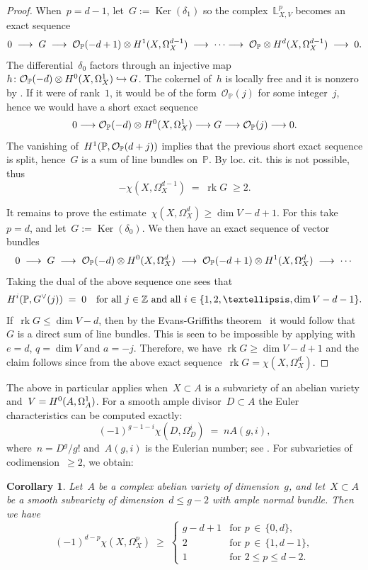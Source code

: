 \documentclass[a4paper]{amsart}
\newcommand{\bbL}{\mathbb{L}}
\newcommand{\bbP}{\mathbb{P}}
\newcommand{\bbZ}{\mathbb{Z}}
\newcommand{\cO}{\mathcal{O}}
\newcommand{\rH}{\textup{H}}
\newcommand{\into}{\hookrightarrow}
\newcommand{\too}{\longrightarrow}
\renewcommand{\ker}{\Ker}
\DeclareMathOperator{\rk}{rk}
\DeclareMathOperator{\Ker}{Ker}
\renewcommand{\le}{\leqslant}
\renewcommand{\ge}{\geqslant}
\theoremstyle{plain}
\newtheorem{corollary}[theorem]{Corollary}
\theoremstyle{definition}
\numberwithin{equation}{section}
\begin{document}
\begin{proof}
When~$p = d-1$, let~$G := \ker(\delta_1)$ so the complex~$\bbL^p_{X,V}$ becomes an exact sequence
\[ 0 \; \too \; G \; \too \; \cO_{\bbP}(-d + 1) \otimes \rH^1(X, \Omega^{d-1}_X) \; \too \; \cdots \too \; \cO_\bbP \otimes \rH^d(X, \Omega^{d-1}_X) \; \too \; 0.\]
The differential~$\delta_0$ factors through an injective map 
$ h \colon \cO_{\bbP}(-d) \otimes \rH^0(X, \Omega^1_X) \into G$. The cokernel of~$h$ is locally free and it is nonzero by \cite[lemma 2.2]{Lombardi13}. If it were of rank~$1$, it would be of the form~$\cO_{\bbP}(j)$ for some integer~$j$, hence we would have a short exact sequence
\[ 0 \too \cO_{\bbP}(-d) \otimes \rH^0(X, \Omega^1_X) \too G \too \cO_{\bbP}(j) \too 0.\]
The vanishing of~$\rH^1(\bbP, \cO_{\bbP}(d + j))$ implies that the previous short exact sequence is split, hence~$G$ is a sum of line bundles on~$\bbP$. By loc. cit. this is not possible, thus
\[ - \chi(X, \Omega^{d-1}_X) \; = \; \rk G \; \ge 2. \]

It remains to prove the estimate~$\chi(X, \Omega^d_X) \ge \dim V - d+1$. For this take~$p=d$, and let~$G := \ker(\delta_0)$. We then have an exact sequence of vector bundles
%
\[
 0 \;\too\; G \;\too\; \cO_\bbP(-d)\otimes \rH^0(X, \Omega^d_X) \;\too\;
 \cO_\bbP(-d+1)\otimes \rH^1(X, \Omega^d_X) \;\too\; \cdots
\]
%
Taking the dual of the above sequence one sees that 
%
\[
 \rH^i(\bbP, G^\vee(j)) \;=\; 0 \quad \text{for all~$j\in \bbZ$ and all~$i\in \{1,2,\dots, \dim V - d - 1\}$}.
\]
%
If~$\rk G \le \dim V - d$, then by the Evans-Griffiths theorem~\cite[ex.~7.3.10]{LazarsfeldPositivityII} it would follow that~$G$ is a direct sum of line bundles. This is seen to be impossible by applying \cite[lemma 2.2 (ii)]{Lombardi13} with $e = d$, $q = \dim V$ and $a = -j$. Therefore, we have 
%
$
 \rk G \ge \dim V - d +1
$
%
and the claim follows since from the above exact sequence~$\rk G = \chi(X, \Omega_X^d)$. 
\end{proof} 

The above in particular applies when~$X\subset A$ is a subvariety of an abelian variety and~$V=\rH^0(A, \Omega_A^1)$. For a smooth ample divisor~$D \subset A$ the Euler characteristics can be computed exactly:
\[ (-1)^{g-1-i} \chi(D, \Omega^i_D) \; = \;  n A(g, i),  \]
where~$n = D^g/g!$ and~$A(g, i)$ is the Eulerian number; see \cite[sect.~3.2]{LS20}. For subvarieties of codimension~$\ge 2$, we obtain:

\begin{corollary} \label{cor:hodge-number-estimates}
Let~$A$ be a complex abelian variety of dimension~$g$, and let~$X\subset A$ be a smooth subvariety of dimension~$d\le g -2$ with ample normal bundle. Then we have
%
\[
 (-1)^{d-p}\chi(X, \Omega^p_X) \;\ge\; 
 \begin{cases} 
  g - d +1& \text{for~$p \,\in\, \{0,d\}$},\\[0.1em]
   2 & \text{for~$p \,\in\, \{ 1, d - 1 \}$}, \\[0.1em]
 1 & \text{for~$2 \le p \le d-2$}.
 \end{cases} 
\]

\end{corollary} 
\end{document}
